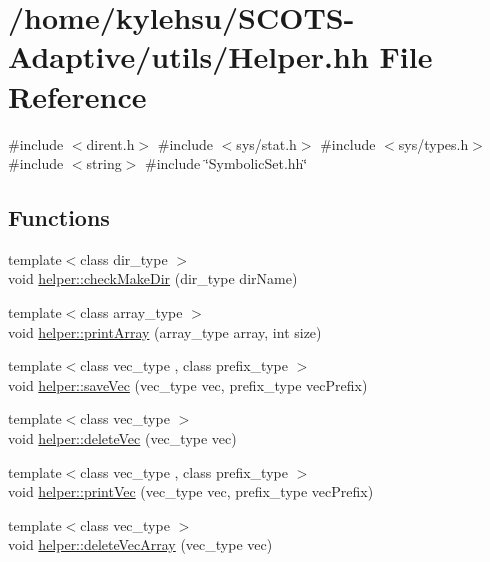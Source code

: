 \hypertarget{Helper_8hh}{}\section{/home/kylehsu/\+S\+C\+O\+T\+S-\/\+Adaptive/utils/\+Helper.hh File Reference}
\label{Helper_8hh}
{\ttfamily \#include $<$dirent.\+h$>$}\newline
{\ttfamily \#include $<$sys/stat.\+h$>$}\newline
{\ttfamily \#include $<$sys/types.\+h$>$}\newline
{\ttfamily \#include $<$string$>$}\newline
{\ttfamily \#include \char`\"{}Symbolic\+Set.\+hh\char`\"{}}\newline
\subsection*{Functions}
\begin{DoxyCompactItemize}
\item 
{\footnotesize template$<$class dir\+\_\+type $>$ }\\void \hyperlink{Helper_8hh_a54c684ce784017d4c61e9fc7a179be67}{helper\+::check\+Make\+Dir} (dir\+\_\+type dir\+Name)
\item 
{\footnotesize template$<$class array\+\_\+type $>$ }\\void \hyperlink{Helper_8hh_ad3a9b9a5d8b46962dae72719f691201c}{helper\+::print\+Array} (array\+\_\+type array, int size)
\item 
{\footnotesize template$<$class vec\+\_\+type , class prefix\+\_\+type $>$ }\\void \hyperlink{Helper_8hh_afea778bfb31cba93e003c382413c36b2}{helper\+::save\+Vec} (vec\+\_\+type vec, prefix\+\_\+type vec\+Prefix)
\item 
{\footnotesize template$<$class vec\+\_\+type $>$ }\\void \hyperlink{Helper_8hh_a4cfbf4be07fc1d320df3c06ab77ff469}{helper\+::delete\+Vec} (vec\+\_\+type vec)
\item 
{\footnotesize template$<$class vec\+\_\+type , class prefix\+\_\+type $>$ }\\void \hyperlink{Helper_8hh_a33cb7ae024bddfc7874b8aaa80d46f4b}{helper\+::print\+Vec} (vec\+\_\+type vec, prefix\+\_\+type vec\+Prefix)
\item 
{\footnotesize template$<$class vec\+\_\+type $>$ }\\void \hyperlink{Helper_8hh_a204cd701ae182be7b10e2017e259285b}{helper\+::delete\+Vec\+Array} (vec\+\_\+type vec)
\end{DoxyCompactItemize}


